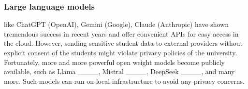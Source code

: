 \subsubsection{Large language models} like ChatGPT (OpenAI), Gemini (Google), Claude (Anthropic) have shown tremendous success in recent years and offer convenient APIs for easy access in the cloud. However, sending sensitive student data to external providers without explicit consent of the students might violate privacy policies of the university. 
Fortunately, more and more powerful open weight models become publicly available, such as Llama ____, Mistral ____, %
DeepSeek ____, and many more. Such models can run on local infrastructure to avoid any privacy concerns.








